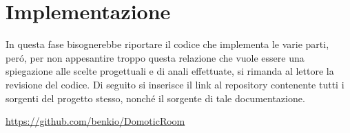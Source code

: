 \section{Implementazione}

In questa fase bisognerebbe riportare il codice che implementa le varie parti, per\'o, per non appesantire troppo questa relazione che vuole essere una spiegazione alle scelte progettuali e di anali effettuate, si rimanda al lettore la revisione del codice. Di seguito si inserisce il link al repository contenente tutti i sorgenti del progetto stesso, nonch\'e il sorgente di tale documentazione.

\url{https://github.com/benkio/DomoticRoom}
